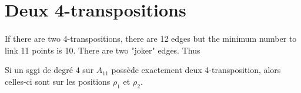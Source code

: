 \section{Deux 4-transpositions}

\paragraph{}
If there are two 4-transpositions, there are 12 edges but the minimum number to link 11 points is 10. There are two "joker" edges. Thus

\begin{theorem}
  Si un sggi de degré $4$ sur $A_{11}$ possède exactement deux 4-transposition, alors celles-ci sont sur les positions $\rho_1$ et $\rho_2$.
\end{theorem}

